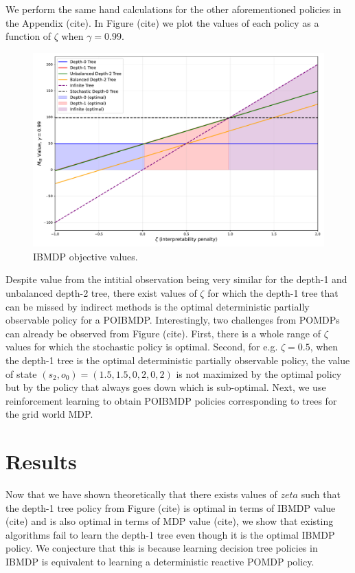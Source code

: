 We perform the same hand calculations for the other aforementioned policies in the Appendix (cite).
In Figure (cite) we plot the values of each policy as a function of $\zeta$ when $\gamma=0.99$.
\begin{figure}
    \centering
    \includegraphics[width=1\textwidth]{images/images_part1/objective_values_plot.pdf}
    \caption{IBMDP objective values.}\label{fig:objectives}
\end{figure}
Despite value from the intitial observation being very similar for the depth-1 and unbalanced depth-2 tree, there exist values of $\zeta$ for which the depth-1 tree that can be missed by indirect methods is the optimal deterministic partially observable policy for a POIBMDP.
Interestingly, two challenges from POMDPs can already be observed from Figure (cite). 
First, there is a whole range of $\zeta$ values for which the stochastic policy is optimal.
Second, for e.g. $\zeta=0.5$, when the depth-1 tree is the optimal deterministic partially observable policy, the value of state $(s_2, o_0) = (1.5, 1.5, 0, 2, 0, 2)$ is not maximized by the optimal policy but by the policy that always goes down which is sub-optimal.
Next, we use reinforcement learning to obtain POIBMDP policies corresponding to trees for the grid world MDP.

\section{Results}
Now that we have shown theoretically that there exists values of $zeta$ such that the depth-1 tree policy from Figure (cite) is optimal in terms of IBMDP value (cite) and is also optimal in terms of MDP value (cite),
we show that existing algorithms fail to learn the depth-1 tree even though it is the optimal IBMDP policy.
We conjecture that this is because learning decision tree policies in IBMDP is equivalent to learning a deterministic reactive POMDP policy.

